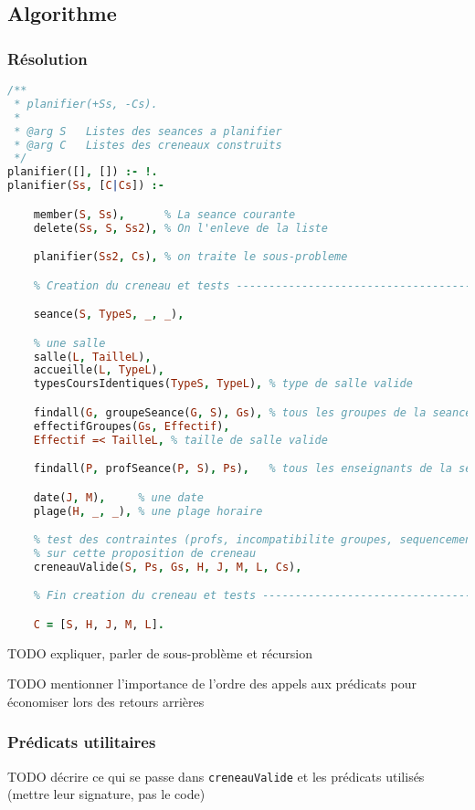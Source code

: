 
\subsection{Algorithme}

\subsubsection{Résolution}

\begin{lstlisting}[language=Prolog, caption=Resolution, captionpos=b]
/**
 * planifier(+Ss, -Cs).
 *
 * @arg S   Listes des seances a planifier
 * @arg C   Listes des creneaux construits
 */
planifier([], []) :- !.
planifier(Ss, [C|Cs]) :-

    member(S, Ss),      % La seance courante
    delete(Ss, S, Ss2), % On l'enleve de la liste

    planifier(Ss2, Cs), % on traite le sous-probleme

    % Creation du creneau et tests ---------------------------------------------

    seance(S, TypeS, _, _),

    % une salle
    salle(L, TailleL),
    accueille(L, TypeL),
    typesCoursIdentiques(TypeS, TypeL), % type de salle valide

    findall(G, groupeSeance(G, S), Gs), % tous les groupes de la seance
    effectifGroupes(Gs, Effectif),
    Effectif =< TailleL, % taille de salle valide

    findall(P, profSeance(P, S), Ps),   % tous les enseignants de la seance

    date(J, M),     % une date
    plage(H, _, _), % une plage horaire

    % test des contraintes (profs, incompatibilite groupes, sequencement)
    % sur cette proposition de creneau
    creneauValide(S, Ps, Gs, H, J, M, L, Cs),

    % Fin creation du creneau et tests -----------------------------------------

    C = [S, H, J, M, L].
\end{lstlisting}

TODO expliquer, parler de sous-problème et récursion

TODO mentionner l'importance de l'ordre des appels aux prédicats pour économiser
lors des retours arrières

\subsubsection{Prédicats utilitaires}

TODO décrire ce qui se passe dans \texttt{creneauValide} et les prédicats
utilisés (mettre leur signature, pas le code)

